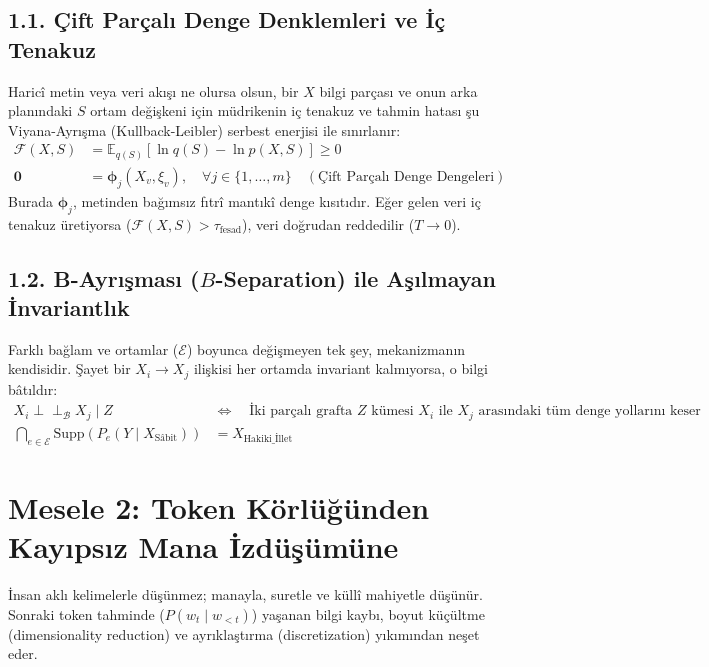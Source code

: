 \documentclass[11pt, a4paper]{article}
\begin{document}
\subsection{1.1. Çift Parçalı Denge Denklemleri ve İç Tenakuz}
Haricî metin veya veri akışı ne olursa olsun, bir $X$ bilgi parçası ve onun arka planındaki $S$ ortam değişkeni için müdrikenin iç tenakuz ve tahmin hatası şu Viyana-Ayrışma (Kullback-Leibler) serbest enerjisi ile sınırlanır:
\begin{align}
\mathcal{F}(X, S) &= \mathbb{E}_{q(S)} \left[ \ln q(S) - \ln p(X, S) \right] \ge 0 \\
\mathbf{0} &= \bm{\phi}_j(X_v, \xi_v), \quad \forall j \in \{1, \dots, m\} \quad (\text{Çift Parçalı Denge Dengeleri})
\end{align}
Burada $\bm{\phi}_j$, metinden bağımsız fıtrî mantıkî denge kısıtıdır. Eğer gelen veri iç tenakuz üretiyorsa ($\mathcal{F}(X, S) > \tau_{\text{fesad}}$), veri doğrudan reddedilir ($T \to 0$).

\subsection{1.2. B-Ayrışması ($B$-Separation) ile Aşılmayan İnvariantlık}
Farklı bağlam ve ortamlar ($\mathcal{E}$) boyunca değişmeyen tek şey, mekanizmanın kendisidir. Şayet bir $X_i \to X_j$ ilişkisi her ortamda invariant kalmıyorsa, o bilgi bâtıldır:
\begin{align}
X_i \perp\!\!\!\perp_{\mathcal{B}} X_j \mid Z \quad &\iff \quad \text{İki parçalı grafta } Z \text{ kümesi } X_i \text{ ile } X_j \text{ arasındaki tüm denge yollarını keser} \\
\bigcap_{e \in \mathcal{E}} \text{Supp}\left( P_e(Y \mid X_{\text{Sâbit}}) \right) &= X_{\text{Hakiki\_İllet}}
\end{align}

\section{Mesele 2: Token Körlüğünden Kayıpsız Mana İzdüşümüne}

İnsan aklı kelimelerle düşünmez; manayla, suretle ve küllî mahiyetle düşünür. Sonraki token tahminde ($P(w_t \mid w_{<t})$) yaşanan bilgi kaybı, boyut küçültme (dimensionality reduction) ve ayrıklaştırma (discretization) yıkımından neşet eder.
\end{document}
